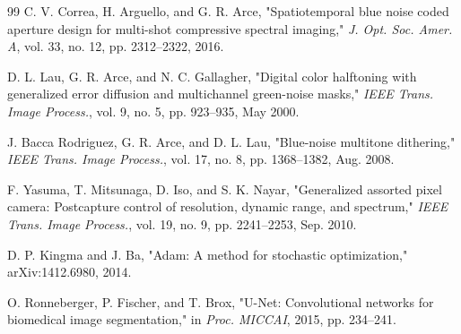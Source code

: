 \documentclass[journal]{IEEEtran}
\begin{document}
\begin{thebibliography}{99}
C. V. Correa, H. Arguello, and G. R. Arce, "Spatiotemporal blue noise coded aperture design for multi-shot compressive spectral imaging," \emph{J. Opt. Soc. Amer. A}, vol. 33, no. 12, pp. 2312--2322, 2016.

D. L. Lau, G. R. Arce, and N. C. Gallagher, "Digital color halftoning with generalized error diffusion and multichannel green-noise masks," \emph{IEEE Trans. Image Process.}, vol. 9, no. 5, pp. 923--935, May 2000.

J. Bacca Rodriguez, G. R. Arce, and D. L. Lau, "Blue-noise multitone dithering," \emph{IEEE Trans. Image Process.}, vol. 17, no. 8, pp. 1368--1382, Aug. 2008.

F. Yasuma, T. Mitsunaga, D. Iso, and S. K. Nayar, "Generalized assorted pixel camera: Postcapture control of resolution, dynamic range, and spectrum," \emph{IEEE Trans. Image Process.}, vol. 19, no. 9, pp. 2241--2253, Sep. 2010.

D. P. Kingma and J. Ba, "Adam: A method for stochastic optimization," arXiv:1412.6980, 2014.

O. Ronneberger, P. Fischer, and T. Brox, "U-Net: Convolutional networks for biomedical image segmentation," in \emph{Proc. MICCAI}, 2015, pp. 234--241.

\end{thebibliography}
\end{document}
